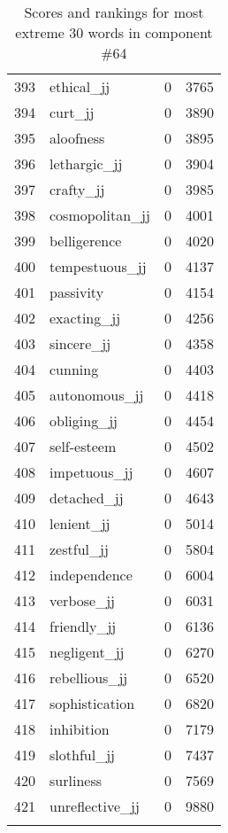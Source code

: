 \begin{longtable}[!htbp]{| rlr@{.}l |}
    393 & ethical\_jj & 0 & 3765 \\
    394 & curt\_jj & 0 & 3890 \\
    395 & aloofness & 0 & 3895 \\
    396 & lethargic\_jj & 0 & 3904 \\
    397 & crafty\_jj & 0 & 3985 \\
    398 & cosmopolitan\_jj & 0 & 4001 \\
    399 & belligerence & 0 & 4020 \\
    400 & tempestuous\_jj & 0 & 4137 \\
    401 & passivity & 0 & 4154 \\
    402 & exacting\_jj & 0 & 4256 \\
    403 & sincere\_jj & 0 & 4358 \\
    404 & cunning & 0 & 4403 \\
    405 & autonomous\_jj & 0 & 4418 \\
    406 & obliging\_jj & 0 & 4454 \\
    407 & self-esteem & 0 & 4502 \\
    408 & impetuous\_jj & 0 & 4607 \\
    409 & detached\_jj & 0 & 4643 \\
    410 & lenient\_jj & 0 & 5014 \\
    411 & zestful\_jj & 0 & 5804 \\
    412 & independence & 0 & 6004 \\
    413 & verbose\_jj & 0 & 6031 \\
    414 & friendly\_jj & 0 & 6136 \\
    415 & negligent\_jj & 0 & 6270 \\
    416 & rebellious\_jj & 0 & 6520 \\
    417 & sophistication & 0 & 6820 \\
    418 & inhibition & 0 & 7179 \\
    419 & slothful\_jj & 0 & 7437 \\
    420 & surliness & 0 & 7569 \\
    421 & unreflective\_jj & 0 & 9880 \\
    \hline
    \caption{Scores and rankings for most extreme 30 words in component \#64} \\
\end{longtable}
